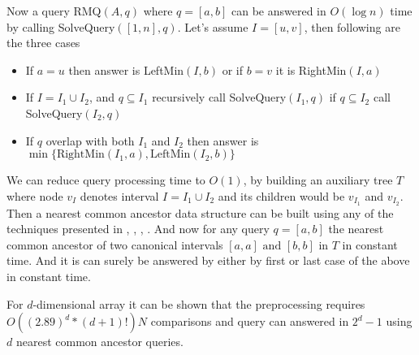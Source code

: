 Now a query RMQ\((A, q)\) where $q=[a,b]$ can be answered in $O(\log n)$ time by calling SolveQuery\(([1,n], q)\). Let's assume $I=[u,v]$, then following are the three cases
\compress
\begin{itemize}  \itemsep0pt \parskip0pt 
  \item If $a=u$ then answer is LeftMin\((I, b)\) or if $b=v$ it is RightMin\((I, a)\)
  \item If $I=I_1 \cup I_2$, and $q \subseteq I_1$ recursively call SolveQuery\((I_1, q)\) if $q \subseteq I_2$ call SolveQuery\((I_2, q)\)
  \item If $q$ overlap with both $I_1$ and $I_2$ then answer is $\min{\{\text{RightMin}(I_1,a),\text{LeftMin}(I_2, b)\}}$
\end{itemize}
We can reduce query processing time to $O(1)$, by building an auxiliary tree $T$ where node $v_I$ denotes interval $I=I_1 \cup I_2$ and its children would be $v_{I_1}$ and $v_{I_2}$. Then a nearest common ancestor data structure can be built using any of the techniques presented in \cite{p4}, \cite{p13}, \cite{p16}, \cite{p15}. And now for any query \(q=[a,b]\) the nearest common ancestor of two canonical intervals \( [a,a] \text{ and } [b,b] \) in $T$ in constant time. And it is can surely be answered by either by first or last case of the above in constant time.

For $d$-dimensional array it can be shown that the preprocessing requires $O((2.89)^d*(d+1)!)N$ comparisons and query can answered in $2^d-1$ using $d$ nearest common ancestor queries.